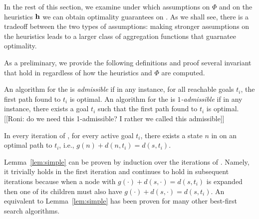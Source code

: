 \label{sec:aggregating}

In the rest of this section, we examine under which assumptions on $\Phi$ and on the heuristics $\mathbf{h}$ we can obtain optimality guarantees on \kastarphi. As we shall see, there is a tradeoff between the two types of assumptions: making stronger assumptions on the heuristics leads to a
larger class of aggregation functions that guarnatee optimality. %

As a preliminary, we provide the following definitions and proof several invariant that hold in \kastar regardless of how the heuristics and $\Phi$ are computed.

\begin{definition}
  An algorithm for the \kgs is \emph{admissible} if in any instance, for all reachable goals $t_i$, the first path found to $t_i$ is optimal.
  An algorithm for the \kgs is \emph{$1$-admissible} if in any instance, there exists a goal $t_i$ such that the first path found to $t_i$ is optimal.
  [[Roni: do we need this 1-admissible? I rather we called this admissible]]
\end{definition}


\begin{lemma}
  \label{lem:simple}
  In every iteration of \kastarphi, for every active goal $t_i$, there exists a state $n$ in \open on an optimal path to $t_i$, i.e., $g(n) + d(n, t_i) = d(s, t_i)$.
\end{lemma}

Lemma~\ref{lem:simple} can be proven by induction over the iterations of \kastarphi. 
Namely, it trivially holds in the first iteration and continues to hold in subsequent iterations because when a node with $g(\cdot) + d(s,\cdot) = d(s, t_i)$ is expanded then one of its children must also have $g(\cdot) + d(s,\cdot) = d(s, t_i)$.
An equivalent to Lemma~\ref{lem:simple} has been proven for many other best-first search algorithms.


